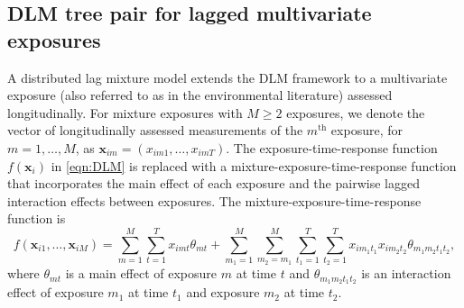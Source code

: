 \subsection{DLM tree pair for lagged multivariate exposures} \label{sec:treepair}
A distributed lag mixture model extends the DLM framework to a multivariate exposure (also referred to as  in the environmental literature) assessed longitudinally. For mixture exposures with $M \geq 2$ exposures, we denote the vector of longitudinally assessed measurements of the $m^{\text{th}}$ exposure, for $m = 1, \dots, M$, as $\bm{x}_{im} =(x_{im1}, \dots, x_{imT})$. The exposure-time-response function $f(\bm{x}_i)$ in \eqref{eqn:DLM} is replaced with a mixture-exposure-time-response function that incorporates the main effect of each exposure and the pairwise lagged interaction effects between exposures. The mixture-exposure-time-response function is
\begin{equation}
\label{eqn:DLMM}
    f(\bm{x}_{i1}, \ldots, \bm{x}_{iM}) = \sum^M_{m = 1} \sum^T_{t = 1} x_{imt}\theta_{mt} +\sum^{M}_{m_1 = 1}\sum^M_{m_2 = m_1} \sum^T_{t_1 = 1}\sum^T_{t_2 = 1} x_{im_1t_1}x_{im_2t_2}\theta_{m_1m_2t_1t_2},
\end{equation}
where $\theta_{mt}$ is a main effect of exposure $m$ at time $t$ and $\theta_{m_1m_2t_1t_2}$ is an interaction effect of exposure $m_1$ at time $t_1$ and exposure $m_2$ at time $t_2$.

